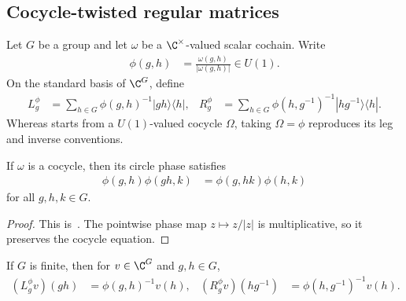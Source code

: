 \subsection{Cocycle-twisted regular matrices}

\begin{definition}
    \label{def:mpug_twisted_regular_matrices}
    \leanok
    Let $G$ be a group and let $\omega$ be a $\C^\times$-valued scalar
    cochain.  Write
    \begin{align}
        \phi(g,h) & =\frac{\omega(g,h)}{|\omega(g,h)|}\in U(1).
    \end{align}
    On the standard basis of $\C^G$, define
    \begin{align}
        L_g^\phi
         & =\sum_{h\in G}\phi(g,h)^{-1}|gh\rangle\langle h|,
         &
        R_g^\phi
         & =\sum_{h\in G}\phi(h,g^{-1})^{-1}|hg^{-1}\rangle\langle h|.
        \label{eq:mpug_twisted_regular_matrices}
    \end{align}
    Whereas \cite[lines~412--418]{FrancoRubio2025MPUGauging} starts from a
    $U(1)$-valued cocycle $\Omega$, taking $\Omega=\phi$ reproduces its leg and
    inverse conventions.
\end{definition}

\begin{lemma}
    \label{lem:mpug_circle_phase_cocycle}
    \leanok
    If $\omega$ is a cocycle, then its circle phase satisfies
    \begin{align}
        \phi(g,h)\phi(gh,k)
         & =\phi(g,hk)\phi(h,k)
    \end{align}
    for all $g,h,k\in G$.
\end{lemma}

\begin{proof}\leanok
    This is~\cite[``Cocycle equation for the circle
        phase'']{QICLean2026Blueprint}.
    The pointwise phase map $z\mapsto z/|z|$ is multiplicative, so it preserves
    the cocycle equation.
\end{proof}

\begin{lemma}
    \label{thm:mpug_twisted_regular_action}
    \leanok
    If $G$ is finite, then for $v\in\C^G$ and $g,h\in G$,
    \begin{align}
        (L_g^\phi v)(gh)
         & =\phi(g,h)^{-1}v(h),
         &
        (R_g^\phi v)(hg^{-1})
         & =\phi(h,g^{-1})^{-1}v(h).
    \end{align}
\end{lemma}

